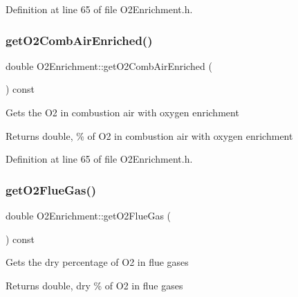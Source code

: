 Definition at line 65 of file O2\+Enrichment.\+h.

\mbox{\label{class_o2_enrichment_a0e9a9ec7987eaa673cb9527b293ded7c}} 
\subsubsection{\texorpdfstring{get\+O2\+Comb\+Air\+Enriched()}{getO2CombAirEnriched()}\hspace{0.1cm}{\footnotesize\ttfamily [3/3]}}
{\footnotesize\ttfamily double O2\+Enrichment\+::get\+O2\+Comb\+Air\+Enriched (\begin{DoxyParamCaption}{ }\end{DoxyParamCaption}) const\hspace{0.3cm}{\ttfamily [inline]}}

Gets the O2 in combustion air with oxygen enrichment \begin{DoxyReturn}{Returns}
double, \% of O2 in combustion air with oxygen enrichment 
\end{DoxyReturn}


Definition at line 65 of file O2\+Enrichment.\+h.

\mbox{\label{class_o2_enrichment_a1d31e1aef5f5a92f38c9a07216d0e539}} 
\subsubsection{\texorpdfstring{get\+O2\+Flue\+Gas()}{getO2FlueGas()}\hspace{0.1cm}{\footnotesize\ttfamily [1/3]}}
{\footnotesize\ttfamily double O2\+Enrichment\+::get\+O2\+Flue\+Gas (\begin{DoxyParamCaption}{ }\end{DoxyParamCaption}) const\hspace{0.3cm}{\ttfamily [inline]}}

Gets the dry percentage of O2 in flue gases \begin{DoxyReturn}{Returns}
double, dry \% of O2 in flue gases 
\end{DoxyReturn}


